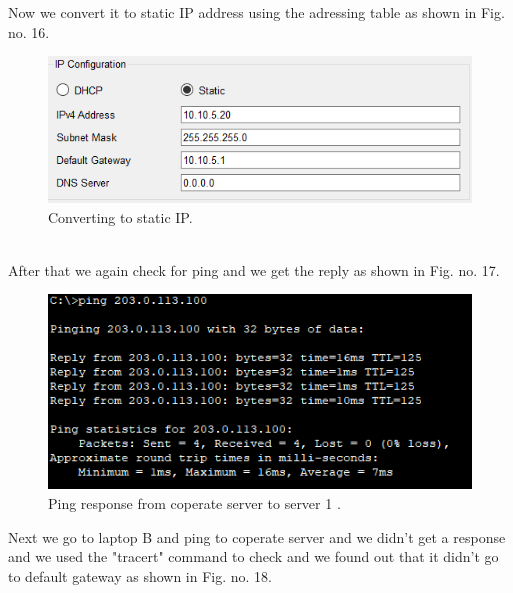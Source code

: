 \documentclass[12pt,a4paper]{article}
\begin{document}
Now we convert it to static IP address using the adressing table as shown in Fig. no. 16.
\begin{figure}[h]
 		\centering
				\includegraphics[scale=0.70]{5.7.png}	


			\caption{Converting to static IP.}
			\label{fig:AP}
	\end{figure} 
\pagebreak \\
 After that we again check for ping and we get the reply as shown in Fig. no. 17.\\
\begin{figure}[h]
 		\centering
				\includegraphics[scale=0.75]{5.8.png}	


			\caption{Ping response from coperate server to server 1 .}
			\label{fig:AP}
	\end{figure}
Next we go to laptop B and ping to coperate server and we didn't get a response and we used the "tracert" command to check and we found out that it didn't go to default gateway as shown in Fig. no. 18.
\end{document}
